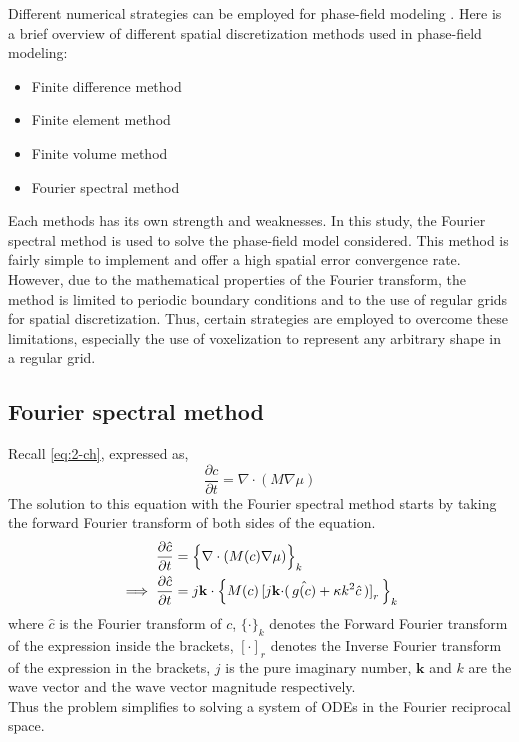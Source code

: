 Different numerical strategies can be employed for phase-field modeling \cite{pfhub}. Here is a brief overview of different spatial discretization methods used in phase-field modeling:
\begin{itemize}
    \item Finite difference method
    \item Finite element method
    \item Finite volume method
    \item Fourier spectral method
\end{itemize}
Each methods has its own strength and weaknesses. In this study, the Fourier spectral method is used to solve the phase-field model considered. This method is fairly simple to implement and offer a high spatial error convergence rate. However, due to the mathematical properties of the Fourier transform, the method is limited to periodic boundary conditions and to the use of regular grids for spatial discretization. Thus, certain strategies are employed to overcome these limitations, especially the use of voxelization to represent any arbitrary shape in a regular grid.
\subsection{Fourier spectral method}
    Recall \autoref{eq:2-ch}, expressed as,
    \begin{equation}
        \frac{\partial c}{\partial t} = \nabla \cdot \left( M \nabla \mu \right)
    \end{equation}
    The solution to this equation with the Fourier spectral method starts by taking the forward Fourier transform of both sides of the equation.
    \begin{align}
        \frac{\partial \hat{c}}{\partial t} &= \Bigl\{\nabla \cdot ( M(c) \nabla \mu ) \Bigl\}_k\\
        \implies \frac{\partial \hat{c}}{\partial t} &= j\mathbf{k} \cdot \Bigl\{ M(c) \left[j\mathbf{k} \cdot \right(\hat{g(c)} + \kappa k^2 \hat{c}\left)\right]_r \Bigl\}_k
    \end{align}
    where $\hat{c}$ is the Fourier transform of $c$, $\{\cdot\}_k$ denotes the Forward Fourier transform of the expression inside the brackets, $\left[\cdot\right]_r$  denotes the Inverse Fourier transform of the expression in the brackets, $j$ is the pure imaginary number, $\mathbf{k}$ and $k$ are the wave vector and the wave vector magnitude respectively.\\
    Thus the problem simplifies to solving a system of ODEs in the Fourier reciprocal space.
